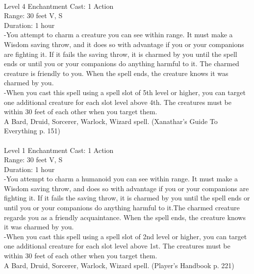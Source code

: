 \documentclass[10pt,twocolumn]{report}
\begin{document}
 \\
Level 4 \quad Enchantment \quad Cast: 1 Action\\
Range: 30 feet \quad V, S\\
Duration: 1 hour \quad \\
-You attempt to charm a creature you can see within range. It must make a Wisdom saving throw, and it does so with advantage if you or your companions are fighting it. If it fails the saving throw, it is charmed by you until the spell ends or until you or your companions do anything harmful to it. The charmed creature is friendly to you. When the spell ends, the creature knows it was charmed by you.\\
-When you cast this spell using a spell slot of 5th level or higher, you can target one additional creature for each slot level above 4th. The creatures must be within 30 feet of each other when you target them.\\
A Bard, Druid, Sorcerer, Warlock, Wizard spell. (Xanathar's Guide To Everything p. 151) \\


 \\
Level 1 \quad Enchantment \quad Cast: 1 Action\\
Range: 30 feet \quad V, S\\
Duration: 1 hour \quad \\
-You attempt to charm a humanoid you can see within range. 
It must make a Wisdom saving throw, and does so with advantage if you or your companions are fighting it. If it fails the saving throw, it is charmed by you until the spell ends or until you  or your companions do anything harmful to it.The charmed creature regards you as a friendly acquaintance. When the spell ends, the creature knows it was charmed by you.\\
-When you cast this spell using a spell slot of 2nd level or higher, you can target one additional creature for each slot level above 1st. The creatures must be within 30 feet of each other when you target them.\\
A Bard, Druid, Sorcerer, Warlock, Wizard spell. (Player's Handbook p. 221) \\
\end{document}
